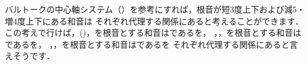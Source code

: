 \documentclass[dvipdfmx,uplatex,b5paper,openany,jbase=12Q,nomag*,textwidth-limit=44%
               ]{gachimuchi}
\begin{document}
\begin{Yodan}
バルトークの中心軸システム（）を参考にすれば，根音が短3度上下および減5・増4度上下にある和音は
それぞれ代理する関係にあると考えることができます．
この考えで行けば\bFlat\Gniii ，\bFlat\Gnv (\bSharp\Gniv )，\Gnvi を根音とする和音はである\Gni を，
\Gnii ，\bFlat\Gnvi ，\Gnvii を根音とする和音はである\Gniv を，
\bFlat\Gnii ，\Gniii ，\bFlat\Gnvii を根音とする和音はである\Gnv を
それぞれ代理する関係にあると言えそうです．


\end{Yodan}
\end{document}
